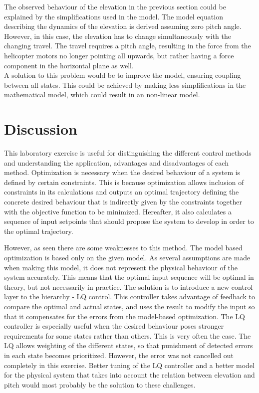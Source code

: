 \documentclass[a4paper, 12pt]{article}\usepackage[utf8]{inputenc}
\begin{document}
The observed behaviour of the elevation in the previous section could be explained by the simplifications used in the model. The model equation describing the dynamics of the elevation is derived assuming zero pitch angle. However, in this case, the elevation has to change simultaneously with the changing travel. The travel requires a pitch angle, resulting in the force from the helicopter motors no longer pointing all upwards, but rather having a force component in the horizontal plane as well.\\
A solution to this problem would be to improve the model, ensuring coupling between all states. This could be achieved by making less simplifications in the mathematical model, which could result in an non-linear model. 

\section{Discussion}

This laboratory exercise is useful for distinguishing the different control methods and understanding the application, advantages and disadvantages of each method. Optimization is necessary when the desired behaviour of a system is defined by certain constraints. This is because optimization allows inclusion of constraints in its calculations and outputs an optimal trajectory defining the concrete desired behaviour that is indirectly given by the constraints together with the objective function to be minimized. Hereafter, it also calculates a sequence of input setpoints that should propose the system to develop in order to the optimal trajectory. 

However, as seen there are some weaknesses to this method. The model based optimization is based only on the given model. As several assumptions are made when making this model, it does not represent the physical behaviour of the system accurately. This means that the optimal input sequence will be optimal in theory, but not necessarily in practice. The solution is to introduce a new control layer to the hierarchy - LQ control. This controller takes advantage of feedback to compare the optimal and actual states, and uses the result to modify the input so that it compensates for the errors from the model-based optimization. The LQ controller is especially useful when the desired behaviour poses stronger requirements for some states rather than others. This is very often the case. The LQ allows weighting of the different states, so that punishment of detected errors in each state becomes prioritized. However, the error was not cancelled out completely in this exercise. Better tuning of the LQ controller and a better model for the physical system that takes into account the relation between elevation and pitch would most probably be the solution to these challenges.
\end{document}
